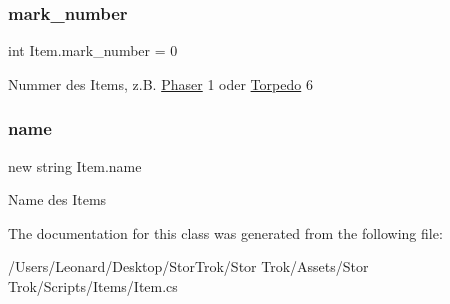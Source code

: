 \subsubsection{\texorpdfstring{mark\+\_\+number}{mark\_number}}
{\footnotesize\ttfamily int Item.\+mark\+\_\+number = 0}



Nummer des Items, z.\+B. \hyperlink{class_phaser}{Phaser} 1 oder \hyperlink{class_torpedo}{Torpedo} 6 

\mbox{\label{class_item_ad853c3926372e263a546f9a411ef5323}} 
\subsubsection{\texorpdfstring{name}{name}}
{\footnotesize\ttfamily new string Item.\+name}



Name des Items 



The documentation for this class was generated from the following file\+:\begin{DoxyCompactItemize}
\item 
/\+Users/\+Leonard/\+Desktop/\+Stor\+Trok/\+Stor Trok/\+Assets/\+Stor Trok/\+Scripts/\+Items/Item.\+cs\end{DoxyCompactItemize}
